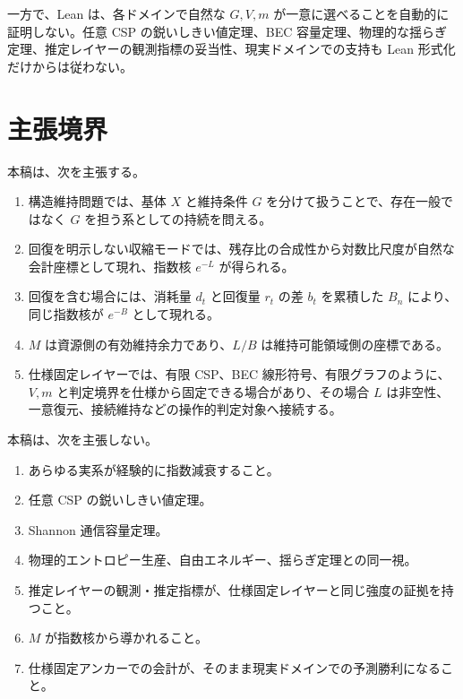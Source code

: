 \documentclass[12pt,a4paper]{article}
\begin{document}
一方で、Lean は、各ドメインで自然な \(G,V,m\) が一意に選べることを自動的に証明しない。任意 CSP の鋭いしきい値定理、BEC 容量定理、物理的な揺らぎ定理、推定レイヤーの観測指標の妥当性、現実ドメインでの支持も Lean 形式化だけからは従わない。

\section{主張境界}\label{ux4e3bux5f35ux5883ux754c}

本稿は、次を主張する。

\begin{enumerate}
\def\labelenumi{\arabic{enumi}.}
\tightlist
\item
  構造維持問題では、基体 \(X\) と維持条件 \(G\) を分けて扱うことで、存在一般ではなく \(G\) を担う系としての持続を問える。
\item
  回復を明示しない収縮モードでは、残存比の合成性から対数比尺度が自然な会計座標として現れ、指数核 \(e^{-L}\) が得られる。
\item
  回復を含む場合には、消耗量 \(d_{t}\) と回復量 \(r_{t}\) の差 \(b_{t}\) を累積した \(B_{n}\) により、同じ指数核が \(e^{-B}\) として現れる。
\item
  \(M\) は資源側の有効維持余力であり、\(L/B\) は維持可能領域側の座標である。
\item
  仕様固定レイヤーでは、有限 CSP、BEC 線形符号、有限グラフのように、\(V,m\) と判定境界を仕様から固定できる場合があり、その場合 \(L\) は非空性、一意復元、接続維持などの操作的判定対象へ接続する。
\end{enumerate}

本稿は、次を主張しない。

\begin{enumerate}
\def\labelenumi{\arabic{enumi}.}
\tightlist
\item
  あらゆる実系が経験的に指数減衰すること。
\item
  任意 CSP の鋭いしきい値定理。
\item
  Shannon 通信容量定理。
\item
  物理的エントロピー生産、自由エネルギー、揺らぎ定理との同一視。
\item
  推定レイヤーの観測・推定指標が、仕様固定レイヤーと同じ強度の証拠を持つこと。
\item
  \(M\) が指数核から導かれること。
\item
  仕様固定アンカーでの会計が、そのまま現実ドメインでの予測勝利になること。
\end{enumerate}
\end{document}
